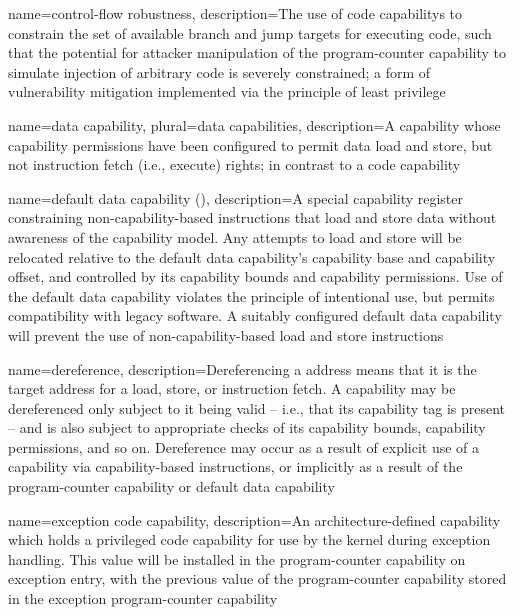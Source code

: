 {
  name=control-flow robustness,
  description={The use of \glspl{code capability} to constrain the set of
    available branch and jump targets for executing code, such that the
    potential for attacker manipulation of the \gls{program-counter
    capability} to simulate injection of arbitrary code is severely
    constrained; a form of \gls{vulnerability mitigation} implemented via
    the \gls{principle of least privilege}}
}

{
  name=data capability,
  plural=data capabilities,
  description={A \gls{capability} whose \gls{capability permissions} have been
    configured to permit data load and store, but not instruction fetch (i.e.,
    execute) rights; in contrast to a \gls{code capability}}
}

{
  name=default data capability (\DDC{}),
  description={A \gls{special capability register} constraining
     non-\gls{capability-based
    instructions} that load and store data without awareness of the capability
    model.
    Any attempts to load and store will be relocated relative to the default
    data capability's \gls{capability base} and \gls{capability offset}, and
    controlled by its \gls{capability bounds} and \gls{capability
    permissions}.
    Use of the default data capability  violates the \gls{principle of
    intentional use}, but permits compatibility with legacy software.
    A suitably configured default data capability will prevent the use of
    non-capability-based load and store instructions}
}

{
  name=dereference,
  description={Dereferencing a \gls{address} means that it is the
    target address for a load, store, or instruction fetch.
    A \gls{capability} may be dereferenced only subject to it being valid
    -- i.e., that its \gls{capability tag} is present --  and is also subject
    to appropriate checks of its \gls{capability bounds}, \gls{capability permissions}, and
    so on.
    Dereference may occur as a result of explicit use of a capability via
    \gls{capability-based instructions}, or implicitly as a result of the
    \gls{program-counter capability} or \gls{default data capability}}
}

{
  name=exception code capability,
  description={An architecture-defined capability which holds a
    privileged \gls{code capability} for use by the kernel during exception
    handling.
    This value will be installed in the \gls{program-counter capability} on
    exception entry, with the previous value of the program-counter
    capability stored in the \gls{exception program-counter capability}}
}

